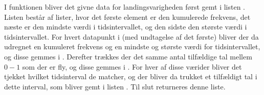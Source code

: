 I funktionen bliver det givne data for landingsvarigheden først gemt i listen . Listen  består af lister, hvor det første element er den kumulerede frekvens, det næste er den mindste værdi i tidsintervallet, og den sidste den største værdi i tidsintervallet.
For hvert datapunkt i  (med undtagelse af det første) bliver der da udregnet en kumuleret frekvens og en mindste og største værdi for tidsintervallet, og disse gemmes i . 
Derefter trækkes der det samme antal tilfældige tal mellem $0-1$ som der er fly, og disse gemmes i .
For hver af disse værider bliver det tjekket hvilket tidsinterval de matcher, og der bliver da trukket et tilfældigt tal i dette interval, som bliver gemt i listen .
Til slut returneres denne liste.
